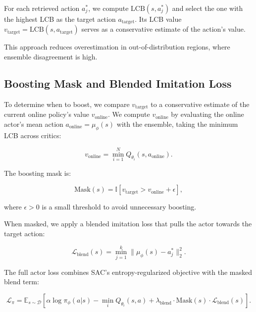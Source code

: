 \documentclass[11pt,a4paper]{article}
\begin{document}
For each retrieved action $a_j^*$, we compute $\mathrm{LCB}(s, a_j^*)$ and select the one with the highest LCB as the target action $a_{\mathrm{target}}$. Its LCB value $v_{\mathrm{target}} = \mathrm{LCB}(s, a_{\mathrm{target}})$ serves as a conservative estimate of the action's value.

This approach reduces overestimation in out-of-distribution regions, where ensemble disagreement is high.

\subsection{Boosting Mask and Blended Imitation Loss}
\label{subsec:blending}

To determine when to boost, we compare $v_{\mathrm{target}}$ to a conservative estimate of the current online policy's value $v_{\mathrm{online}}$. We compute $v_{\mathrm{online}}$ by evaluating the online actor's mean action $a_{\mathrm{online}} = \mu_\phi(s)$ with the ensemble, taking the minimum LCB across critics:

\begin{equation}
v_{\mathrm{online}} = \min_{i=1}^N Q_{\theta_i}(s, a_{\mathrm{online}}).
\end{equation}

The boosting mask is:

\begin{equation}
\mathrm{Mask}(s) = \mathbb{I}[v_{\mathrm{target}} > v_{\mathrm{online}} + \epsilon],
\end{equation}

where $\epsilon > 0$ is a small threshold to avoid unnecessary boosting.

When masked, we apply a blended imitation loss that pulls the actor towards the target action:

\begin{equation}
\mathcal{L}_{\mathrm{blend}}(s) = \min_{j=1}^k \| \mu_\phi(s) - a_j^* \|_2^2.
\end{equation}

The full actor loss combines SAC's entropy-regularized objective with the masked blend term:

\begin{equation}
\mathcal{L}_\pi = \mathbb{E}_{s \sim \mathcal{D}} \left[ \alpha \log \pi_\phi(a|s) - \min_i Q_{\theta_i}(s,a) + \lambda_{\mathrm{blend}} \cdot \mathrm{Mask}(s) \cdot \mathcal{L}_{\mathrm{blend}}(s) \right].
\end{equation}
\end{document}
